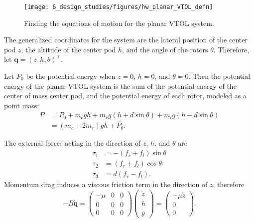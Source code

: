 
\begin{figure}[htb]
  \centering
  \texttt{[image: 6\_design\_studies/figures/hw\_planar\_VTOL\_defn]}
  \caption{Finding the equations of motion for the planar VTOL system.}
  \label{fig:hw_planar_VTOL_defn}
\end{figure}

The generalized coordinates for the system are the lateral position of the center pod $z$, the altitude of the center pod $h$, and the angle of the rotors $\theta$.  Therefore, let $\mathbf{q} = (z, h, \theta)^\top$.

Let $P_0$ be the potential energy when $z=0$, $h=0$, and $\theta=0$.  Then the potential energy of the planar VTOL system is the sum of the potential energy of the center of mass center pod, and the potential energy of each rotor, modeled as a point mass:
\begin{align*}
  P &= P_0 + m_c g h + m_r g (h + d \sin\theta) + m_l g (h - d \sin\theta)  \\
    &= (m_c + 2 m_r) g h + P_0.
\end{align*}

The external forces acting in the direction of $z$, $h$, and $\theta$ are
\begin{align*}
  \tau_1 &= -(f_r + f_l) \sin\theta \\
  \tau_2 &= (f_r + f_l) \cos\theta \\
  \tau_3 &= d (f_r - f_l).
\end{align*}
Momentum drag induces a viscous friction term in the direction of $z$, therefore
\[
-B\dot{\mathbf{q}} = \begin{pmatrix} -\mu & 0 & 0 \\ 0 & 0 & 0 \\ 0 & 0 & 0 \end{pmatrix}\begin{pmatrix} \dot{z} \\ \dot{h} \\ \dot{\theta} \end{pmatrix} = \begin{pmatrix} -\mu \dot{z} \\ 0 \\ 0 \end{pmatrix}.
\]

